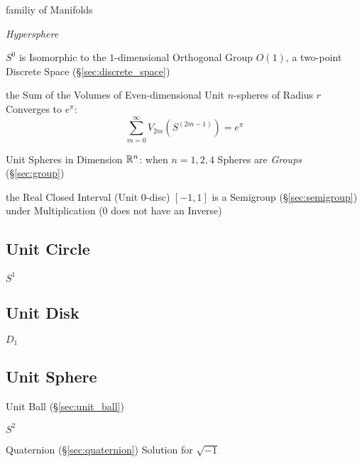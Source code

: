 familiy of Manifolds

\emph{Hypersphere}

$S^0$ is Isomorphic to the $1$-dimensional Orthogonal Group $O(1)$, a
two-point Discrete Space (\S\ref{sec:discrete_space})

the Sum of the Volumes of Even-dimensional Unit $n$-spheres of Radius $r$
Converges to $e^\pi$:
\[
  \sum_{m=0}^\infty V_{2m}(S^{(2m-1)}) = e^\pi
\]

Unit Spheres in Dimension $\mathbb{R}^n$: when $n = 1, 2, 4$ Spheres are
\emph{Groups} (\S\ref{sec:group})



the Real Closed Interval (Unit 0-disc) $[-1,1]$ is a Semigroup
(\S\ref{sec:semigroup}) under Multiplication ($0$ does not have an Inverse)



\subsection{Unit Circle}\label{sec:unit_circle}

$S^1$



\subsection{Unit Disk}\label{sec:unit_disk}

$D_1$



\subsection{Unit Sphere}\label{sec:unit_sphere}

Unit Ball (\S\ref{sec:unit_ball})

$S^2$

Quaternion (\S\ref{sec:quaternion}) Solution for $\sqrt{-1}$

